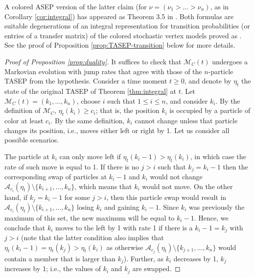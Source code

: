 \documentclass[11pt,reqno]{amsart}
\theoremstyle{definition}
\theoremstyle{remark}
\theoremstyle{remark}
\def\leq{\leqslant}
\def\geq{\geqslant}
\renewcommand\le{\leq}
\renewcommand\ge{\geq}
\def\A{\mathcal A}
\def\M{\mathcal M}
\numberwithin{equation}{section}
\begin{document}
	A colored ASEP version of the latter claim (for $\nu=(\nu_1>\dots>\nu_n)$, as in Corollary \ref{cor:integral}) has appeared as Theorem 3.5 in \cite{deGier-Mead-Wheeler}. Both formulas are suitable degenerations of an integral representation for transition probabilities (or entries of a transfer matrix) of the colored stochastic vertex models proved as \cite[(9.5.2)]{BW-coloured}. See the proof of Proposition \ref{prop:TASEP-transition} below for more details. 
	
	\begin{proof}[Proof of Proposition \ref{prop:duality}] It suffices to check that $\M_C(t)$ undergoes a Markovian evolution with jump rates that agree with those of the $n$-particle TASEP from the hypothesis. Consider a time moment $t\ge 0$, and denote by $\eta_t$ the state of the original TASEP of Theorem \ref{thm:integral} at $t$. Let $\M_C(t)=(k_1,\dots,k_n)$, choose $i$ such that $1\le i\le n$, and consider $k_i$. By the definition of $\M_C$, $\eta_t(k_i)\ge c_i$; that is, the position $k_i$ is occupied by a particle of color at least $c_i$. By the same definition, $k_i$ cannot change unless that particle changes its position, i.e., moves either left or right by 1. Let us consider all possible scenarios.    
		
		The particle at $k_i$ can only move left if $\eta_t(k_i-1)>\eta_t(k_i)$, in which case the rate of such move is equal to 1. If there is no $j>i$ such that $k_j=k_i-1$ then the corresponding swap of particles at $k_i-1$ and $k_i$ would not change $\A_{c_i}(\eta_t)\setminus\{k_{i+1},\dots,k_n\}$, which means that $k_i$ would not move. On the other hand, if $k_j=k_i-1$ for some $j>i$, then this particle swap would result in $\A_{c_i}(\eta_t)\setminus\{k_{i+1},\dots,k_n\}$ losing $k_i$ and gaining $k_{i}-1$. Since $k_i$ was previously the maximum of this set, the new maximum will be equal to $k_i-1$. Hence, we conclude that $k_i$ moves to the left by 1 with rate 1 if there is a $k_i-1=k_j$ with $j>i$ (note that the latter condition also implies that $\eta_t(k_i-1)=\eta_t(k_j)>\eta_t(k_i)$ as otherwise $\A_{c_j}(\eta_t)\setminus\{k_{j+1},\dots,k_n\}$ would contain a member that is larger than $k_j$). Further, as $k_i$ decreases by 1, $k_j$ increases by 1; i.e., the values of $k_i$ and $k_j$ are swapped. 
		

\end{proof}
\end{document}
